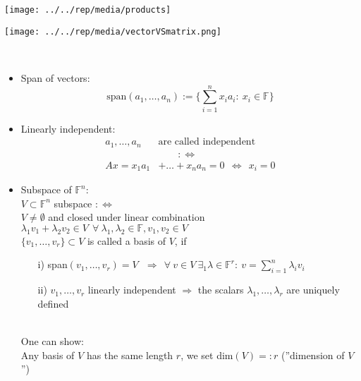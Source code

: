 \begin{frame}
		\texttt{[image: ../../rep/media/products]}	
\end{frame}
\begin{frame}
	\texttt{[image: ../../rep/media/vectorVSmatrix.png]}	
\end{frame}
\begin{frame}
	~\\
	{\blank
		\begin{itemize}\blank
			\item Span of vectors:
			$$
			\text{span}(a_1,\dots,a_n):=\lbrace \sum_{i=1}^{n}x_ia_i:~x_i\in\mathbb{F} \rbrace
			$$
			\item Linearly independent:
			\begin{align*}
			a_1,\dots,a_n~&\text{are called independent}\\
			&~~~~~~~~~:\Leftrightarrow\\
			Ax = x_1a_1&+\dots+x_na_n=0~~\Leftrightarrow~~x_i = 0
			\end{align*}
			\item Subspace of $\mathbb{F}^n$:\\
			$V\subset\mathbb{F}^n$ subspace $:\Leftrightarrow$\\
			$V\neq\emptyset$ and closed under linear combination $\lambda_1v_1+\lambda_2v_2\in V~~\forall~\lambda_1,\lambda_2\in\mathbb{F},v_1,v_2\in V$\\
			$\{v_1,\dots,v_r\}\subset V$ is called a basis of $V$, if
			\begin{itemize}\blank
				\item[i)]
				span$(v_1,\dots,v_r) = V~~~\Rightarrow~~\forall~v\in V~\exists_1\lambda\in\mathbb{F}^r:~v=\sum_{i=1}^{n}\lambda_iv_i$
				\item[ii)]
				$v_1,\dots,v_r$ linearly independent $\Rightarrow$ the scalars $\lambda_1,\dots,\lambda_r$ are uniquely defined
			\end{itemize}
			~\\
			One can show:\\
			Any basis of $V$ has the same length $r$, we set dim$(V)=:r$ (''dimension of $V$'')
		\end{itemize}
	}
\end{frame}
